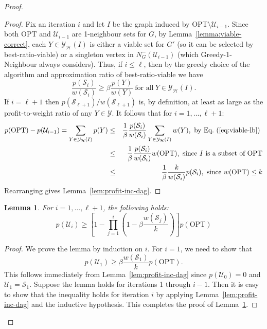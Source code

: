 \documentclass[12pt]{article}
\newtheorem{lemma}[theorem]{Lemma}
\newcommand{\OPT}{\ensuremath{\mathrm{OPT}\xspace}}
\begin{document}
\begin{proof}
\begin{proof}
Fix an iteration $i$ and let $I$ be the graph induced by $\OPT \setminus \mathcal{U}_{i-1}$.  Since both $\OPT$ and $\mathcal{U}_{i-1}$ are 1-neighbour sets for $G$, by Lemma~\ref{lemma:viable-correct}, each $Y \in \mathcal{Y}_{\mathcal{H}}(I)$ is either a viable set for $G'$ (so it can be selected by {\sc best-ratio-viable}) or a singleton vertex in $N^{-}_{G}(\mathcal{U}_{i-1})$ (which {\sc Greedy-1-Neighbour} always considers).  Thus, if $i \leq \ell$, then by the greedy choice of the algorithm and approximation ratio of {\sc best-ratio-viable} we have
\begin{equation} \label{eq:viable-lb}
\frac{p(\mathcal{S}_i)}{w(\mathcal{S}_i)} \geq \beta \frac{p(Y)}{w(Y)} \ \mbox{for all} \ Y \in \mathcal{Y}_{\mathcal{H}}(I).
\end{equation}
If $i=\ell+1$ then $p(\mathcal{S}_{\ell+1})/w(\mathcal{S}_{\ell+1})$ is, by definition, at least as large as the profit-to-weight ratio of any $Y \in \mathcal{Y}$.  It follows that for $i=1, \ldots, \ell+1$:
\begin{eqnarray*}
p(\OPT) - p(\mathcal{U}_{i-1}) = \sum_{Y \in \mathcal{Y}_{\mathcal{H}}(I)} p(Y) & \leq &
\frac{1}{\beta}\frac{p(\mathcal{S}_i)}{w(\mathcal{S}_i)} \sum_{Y \in \mathcal{Y}_{\mathcal{H}}(I)}
w(Y),\mbox{ by Eq.~(\ref{eq:viable-lb}) }\\
& \leq & \frac{1}{\beta}\frac{p(\mathcal{S}_i)}{w(\mathcal{S}_i)} w(\OPT),\mbox{
since $I$ is a subset of \OPT} \\
& \leq & \frac{1}{\beta}\frac{k}{w(\mathcal{S}_i)}p(\mathcal{S}_i),\mbox{ since
$w(\OPT) \leq k$}
\end{eqnarray*}
Rearranging gives Lemma~\ref{lem:profit-inc-dag}.
\hfill  \end{proof}

\begin{lemma} \label{lem:profit}
For $i = 1, \ldots, \ell+1$, the following holds:
$$p(\mathcal{U}_i) \geq \left[1-\prod_{j = 1}^i
\left(1-\beta\frac{w(\mathcal{S}_j)}{k} \right) \right] p(\OPT)$$
\end{lemma}

\begin{proof}
We prove the lemma by induction on $i$.  For $i = 1$, we need to
show that
\begin{equation}\label{eq:induct-1}
p(\mathcal{U}_1)  \geq \beta\frac{w(\mathcal{S}_1)}{k}
p(\OPT).
\end{equation}
This follows immediately from Lemma~\ref{lem:profit-inc-dag} since $p(\mathcal{U}_{0})=0$ and $\mathcal{U}_{1}=\mathcal{S}_1$. Suppose the lemma holds for iterations 1 through $i-1$.  Then it is
easy to show that the inequality holds for iteration $i$ by applying
Lemma~\ref{lem:profit-inc-dag} and the inductive hypothesis.  This
completes the proof of Lemma~\ref{lem:profit}.
\hfill
\end{proof}











\end{proof}
\end{document}

